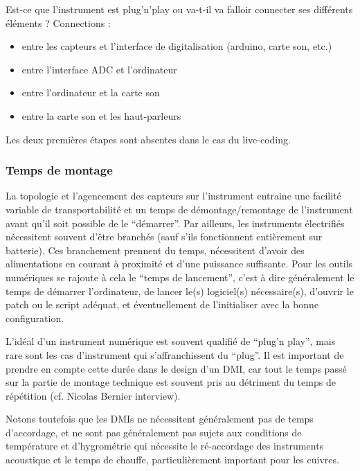 Est-ce que l'instrument est plug'n'play ou va-t-il va falloir connecter ses différents éléments ? Connections : 
\vspace{-1em}
\begin{itemize}[noitemsep]
	\item entre les capteurs et l'interface de digitalisation (arduino, carte son, etc.)
	\item entre l'interface ADC et l'ordinateur
	\item entre l'ordinateur et la carte son
	\item entre la carte son et les haut-parleurs
\end{itemize}

Les deux premières étapes sont absentes dans le cas du live-coding.


\subsubsection{Temps de montage}

La topologie et l'agencement des capteurs sur l'instrument entraine une facilité variable de transportabilité et un temps de démontage/remontage de l'instrument avant qu'il soit possible de le ``démarrer''.
Par ailleurs, les instruments électrifiés nécessitent souvent d'être branchés (sauf s'ils fonctionnent entièrement sur batterie). Ces branchement prennent du temps, nécessitent d'avoir des alimentations en courant à proximité et d'une puissance suffisante. Pour les outils numériques se rajoute à cela le ``temps de lancement'', c'est à dire généralement le temps de démarrer l'ordinateur, de lancer le(s) logiciel(s) nécessaire(s), d'ouvrir le patch ou le script adéquat, et éventuellement de l'initialiser avec la bonne configuration.

L'idéal d'un instrument numérique est souvent qualifié de ``plug'n play'', mais rare sont les cas d'instrument qui s'affranchissent du ``plug''. Il est important de prendre en compte cette durée dans le design d'un DMI, car tout le temps passé sur la partie de montage technique est souvent pris au détriment du temps de répétition (cf. Nicolas Bernier interview). 

Notons toutefois que les DMIs ne nécessitent généralement pas de temps d'accordage, et ne sont pas généralement pas sujets aux conditions de température et d'hygrométrie qui nécessite le ré-accordage des instruments acoustique et le temps de chauffe, particulièrement important pour les cuivres.



